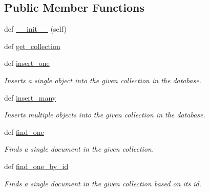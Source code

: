\subsection*{Public Member Functions}
\begin{DoxyCompactItemize}
\item 
def \hyperlink{classNEAT__PyGenetics_1_1NEAT_1_1Tests_1_1MockClasses_1_1mock__DatabaseConnector_1_1mock__DatabaseConnector_a02398d61ab2bab01e548b901cd4d70f7}{\+\_\+\+\_\+init\+\_\+\+\_\+} (self)
\item 
def \hyperlink{classNEAT__PyGenetics_1_1NEAT_1_1Tests_1_1MockClasses_1_1mock__DatabaseConnector_1_1mock__DatabaseConnector_aef1a53517f1680bcc5ddfcbeff3f4785}{get\+\_\+collection}
\item 
def \hyperlink{classNEAT__PyGenetics_1_1NEAT_1_1Tests_1_1MockClasses_1_1mock__DatabaseConnector_1_1mock__DatabaseConnector_a9f8c8a2adf0987729548df63dfe118e8}{insert\+\_\+one}
\begin{DoxyCompactList}\small\item\em Inserts a single object into the given collection in the database. \end{DoxyCompactList}\item 
def \hyperlink{classNEAT__PyGenetics_1_1NEAT_1_1Tests_1_1MockClasses_1_1mock__DatabaseConnector_1_1mock__DatabaseConnector_a0c7202b51bd1bf1001d3748ac39d825b}{insert\+\_\+many}
\begin{DoxyCompactList}\small\item\em Inserts multiple objects into the given collection in the database. \end{DoxyCompactList}\item 
def \hyperlink{classNEAT__PyGenetics_1_1NEAT_1_1Tests_1_1MockClasses_1_1mock__DatabaseConnector_1_1mock__DatabaseConnector_ac03ab8b0c7fda497eac3ca7435aec3a0}{find\+\_\+one}
\begin{DoxyCompactList}\small\item\em Finds a single document in the given collection. \end{DoxyCompactList}\item 
def \hyperlink{classNEAT__PyGenetics_1_1NEAT_1_1Tests_1_1MockClasses_1_1mock__DatabaseConnector_1_1mock__DatabaseConnector_ace6331811ba2e674ef037a66d073377a}{find\+\_\+one\+\_\+by\+\_\+id}
\begin{DoxyCompactList}\small\item\em Finds a single document in the given collection based on its id. \end{DoxyCompactList}\item 

\end{DoxyCompactItemize}
